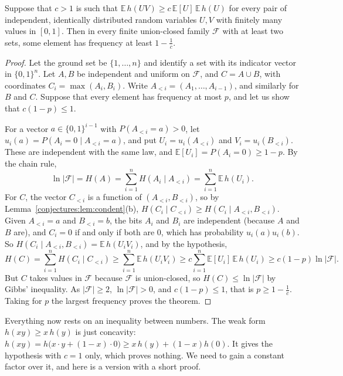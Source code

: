\begin{theorem}\label{conjectures:thm:gilmer}
Suppose that $c>1$ is such that $\mathbb E\,h(UV)\ge c\,\mathbb E[U]\,\mathbb E\,h(U)$ for every pair of independent, identically distributed random
variables $U,V$ with finitely many values in $[0,1]$. Then in every finite union-closed family $\mathcal F$ with at least two sets, some element has
frequency at least $1-\frac1c$.
\end{theorem}
\begin{proof}
Let the ground set be $\{1,\dots,n\}$ and identify a set with its indicator vector in $\{0,1\}^n$. Let $A,B$ be independent and uniform on $\mathcal F$,
and $C=A\cup B$, with coordinates $C_i=\max(A_i,B_i)$. Write $A_{<i}=(A_1,\dots,A_{i-1})$, and similarly for $B$ and $C$. Suppose that every element has
frequency at most $p$, and let us show that $c(1-p)\le1$.

For a vector $a\in\{0,1\}^{i-1}$ with $P(A_{<i}=a)>0$, let $u_i(a)=P(A_i=0\mid A_{<i}=a)$, and put $U_i=u_i(A_{<i})$ and $V_i=u_i(B_{<i})$. These are
independent with the same law, and $\mathbb E[U_i]=P(A_i=0)\ge1-p$. By the chain rule,
\[
\ln|\mathcal F|=H(A)=\sum_{i=1}^nH(A_i\mid A_{<i})=\sum_{i=1}^n\mathbb E\,h(U_i).
\]
For $C$, the vector $C_{<i}$ is a function of $(A_{<i},B_{<i})$, so by Lemma~\ref{conjectures:lem:condent}(b),
$H(C_i\mid C_{<i})\ge H(C_i\mid A_{<i},B_{<i})$. Given $A_{<i}=a$ and $B_{<i}=b$, the bits $A_i$ and $B_i$ are independent (because $A$ and $B$ are), and
$C_i=0$ if and only if both are $0$, which has probability $u_i(a)u_i(b)$. So $H(C_i\mid A_{<i},B_{<i})=\mathbb E\,h(U_iV_i)$, and by the hypothesis,
\[
H(C)=\sum_{i=1}^nH(C_i\mid C_{<i})\ge\sum_{i=1}^n\mathbb E\,h(U_iV_i)\ge c\sum_{i=1}^n\mathbb E[U_i]\,\mathbb E\,h(U_i)\ge c(1-p)\ln|\mathcal F|.
\]
But $C$ takes values in $\mathcal F$ because $\mathcal F$ is union-closed, so $H(C)\le\ln|\mathcal F|$ by Gibbs' inequality. As $|\mathcal F|\ge2$,
$\ln|\mathcal F|>0$, and $c(1-p)\le1$, that is $p\ge1-\frac1c$. Taking for $p$ the largest frequency proves the theorem.
\end{proof}

Everything now rests on an inequality between numbers. The weak form $h(xy)\ge x\,h(y)$ is just concavity: $h(xy)=h\bigl(x\cdot y+(1-x)\cdot0\bigr)\ge
x\,h(y)+(1-x)h(0)$. It gives the hypothesis with $c=1$ only, which proves nothing. We need to gain a constant factor over it, and here is a version with a
short proof.

